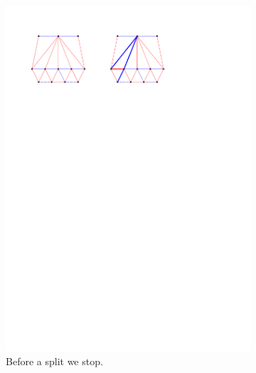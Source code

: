 \begin{figure}[!b]
\begin{subfigure}[t]{0.45 \textwidth}
        \includegraphics[width = \textwidth]{topFanFlips/img/split}
        \caption{Before a split we stop.}
        \label{fig:fanflip:split}
    \end{subfigure}
    ~
    \begin{subfigure}[t]{0.45 \textwidth}

\end{subfigure}
\end{figure}
